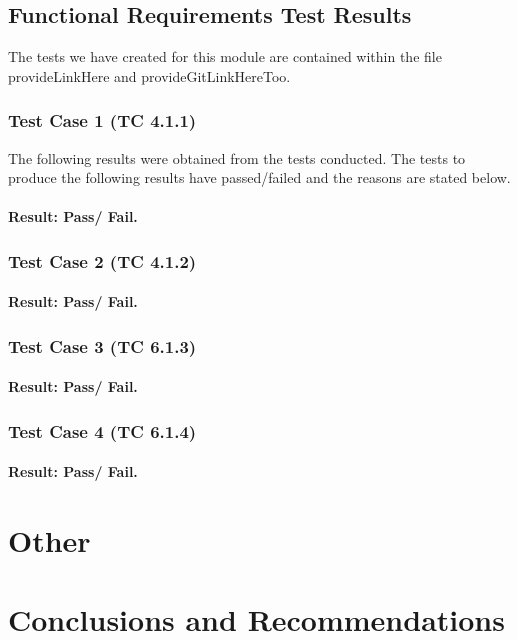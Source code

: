 \documentclass[a4paper,12pt]{article}
\begin{document}
\subsection{Functional Requirements Test Results}
The tests we have created for this module are contained within the file provideLinkHere and provideGitLinkHereToo.

\subsubsection{Test Case 1 (TC 4.1.1)}
The following results were obtained from the tests conducted. The tests to produce the
following results have passed/failed and the reasons are stated below.
\paragraph{Result: Pass/ Fail.}

\subsubsection{Test Case 2 (TC 4.1.2)}
\paragraph{Result: Pass/ Fail.}

\subsubsection{Test Case 3 (TC 6.1.3)}
\paragraph{Result: Pass/ Fail.}

\subsubsection{Test Case 4 (TC 6.1.4)}
\paragraph{Result: Pass/ Fail.}

\section{Other}

\section{Conclusions and Recommendations}
\end{document}

